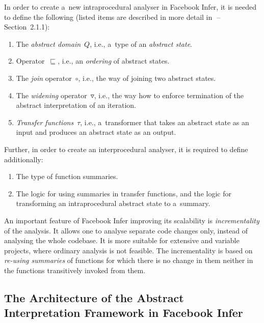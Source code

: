 In order to create a~new intraprocedural analyser in Facebook Infer,
it is needed to define the following (listed items are described in more detail
in~\cite{harmimBP}\,--\,Section~2.1.1):
\begin{enumerate}
    \item
        The \emph{abstract domain}~$ Q $, i.e., a~type of an \emph{abstract
        state}.

    \item
        Operator~$ \sqsubseteq $, i.e., an \emph{ordering} of abstract states.

    \item
        The \emph{join} operator~$ \circ $, i.e., the way of joining two
        abstract states.

    \item
        The \emph{widening} operator~$ \triangledown $, i.e., the way how to
        enforce termination of the abstract interpretation of an iteration.

    \item
        \emph{Transfer functions}~$ \tau $, i.e., a~transformer that takes an
        abstract state as an input and produces an abstract state as an output.
\end{enumerate}
Further, in order to create an interprocedural analyser, it is required to
define additionally:
\begin{enumerate}
    \item
        The type of function summaries.

    \item
        The logic for using summaries in transfer functions, and the logic for
        transforming an intraprocedural abstract state to a~summary.
\end{enumerate}

An important feature of Facebook Infer improving its scalability is
\emph{incrementality} of the analysis. It allows one to analyse separate code
changes only, instead of analysing the whole codebase. It is more suitable for
extensive and variable projects, where ordinary analysis is not feasible. The
incrementality is based on \emph{re-using summaries} of functions for which
there is no change in them neither in the functions transitively invoked from
them.

\subsection{%
    The Architecture of the Abstract Interpretation Framework in Facebook
    Infer%
}
\label{sec:fbinferArch}

